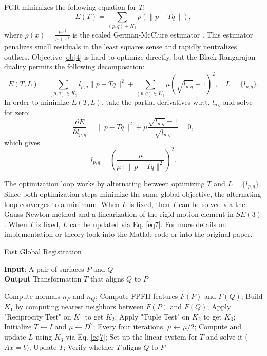 \documentclass[10pt,a4paper]{article}
\begin{document}
FGR minimizes the following equation for $T$:  
\begin{equation}\label{obj4}
E(T) = \sum_{(p,q) \in K_3} \rho (\|p - Tq\|), 
\end{equation}
where $\rho(x) = \frac{\mu x^2}{\mu + x^2}$ is the scaled German-McClure estimator \cite{zhou2016fast}. This estimator penalizes small residuals in the least squares sense and rapidly neutralizes outliers. Objective \ref{obj4} is hard to optimize directly, but the Black-Rangarajan duality permits the following decomposition:
\begin{equation}
E(T,L) = \sum_{(p,q) \in K_3} l_{p,q} \|p-Tq\|^2 + \sum_{(p,q) \in K_3} \mu (\sqrt{l_{p,q}}-1)^2,\quad L = \{l_{p,q}\}.
\end{equation}
In order to minimize $E(T,L)$, take the partial derivatives w.r.t. $l_{p.q}$ and solve for zero:
\begin{equation}
\frac{\partial E}{\partial l_{p,q}} = \|p - Tq\|^2 + \mu \frac{\sqrt{l_{p,q}}-1}{\sqrt{l_{p,q}}} = 0,
\end{equation}
which gives
\begin{equation}\label{eq7}
l_{p,q} = \left( \frac{\mu}{\mu + \|p-Tq\|^2} \right)^2.
\end{equation}

The optimization loop works by alternating between optimizing $T$ and $L = \{l_{p,q}\}$. 
Since both optimization steps minimize the same global objective, the alternating loop converges to a minimum. When $L$ is fixed, then $T$ can be solved via the Gauss-Newton method  and a linearization of the rigid motion element in $SE(3)$. When $T$ is fixed, $L$ can be updated via Eq. \ref{eq7}. For more details on implementation or theory look into the Matlab code or into the original paper.

\begin{algorithm}
	\caption{Fast Global Registration}\label{euclid}
	 \hspace*{\algorithmicindent} \textbf{Input}: A pair of surfaces $P$ and $Q$ \\
	\hspace*{\algorithmicindent} \textbf{Output} Transformation $T$ that aligns $Q$ to $P$ 
	\begin{algorithmic}[1]
		\State Compute normals $n_P$ and $n_Q$;
		\State Compute FPFH features $F(P)$ and $F(Q)$;
		\State Build $K_1$ by computing nearest neighbors between $F(P)$ and $F(Q)$;
		\State Apply "Reciprocity Test" on $K_1$ to get $K_2$;
		\State Apply "Tuple Test" on $K_2$ to get $K_3$;
		\State Initialize $T \leftarrow I$ and $\mu \leftarrow D^2$;
			\State Every four iterations, $\mu \leftarrow \mu/2$;
			\State Compute and update $L$ using $K_3$ via Eq. \ref{eq7};
			\State Set up the linear system for $T$ and solve it ($Ax = b$);
			\State Update $T$;
		\EndWhile
		\State Verify whether $T$ aligns $Q$ to $P$
	\end{algorithmic}
\end{algorithm}
\end{document}
